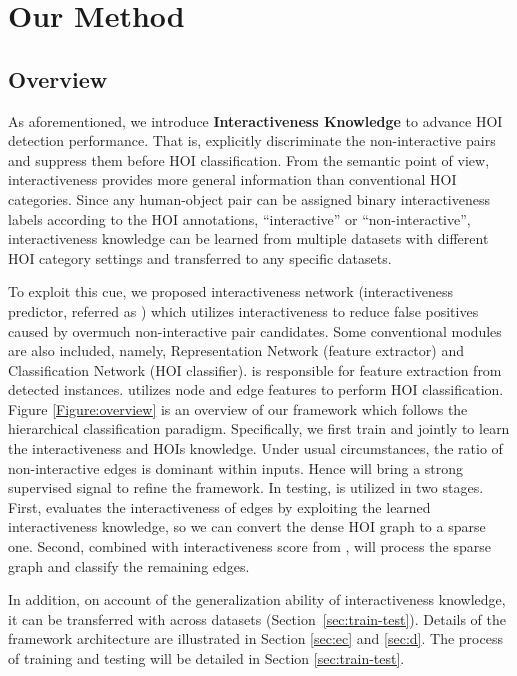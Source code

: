 \documentclass[10pt,twocolumn,letterpaper]{article}
\begin{document}
\section{Our Method}
\subsection{Overview}
As aforementioned, we introduce \textbf{Interactiveness Knowledge} to advance HOI detection performance. That is, explicitly discriminate the non-interactive pairs and suppress them before HOI classification. From the semantic point of view, interactiveness provides more general information than conventional HOI categories. Since any human-object pair can be assigned binary interactiveness labels according to the HOI annotations, \ie ``interactive'' or ``non-interactive'', interactiveness knowledge can be learned from multiple datasets with different HOI category settings and transferred to any specific datasets.

To exploit this cue, we proposed interactiveness network (interactiveness predictor, referred as ) which utilizes interactiveness to reduce false positives caused by overmuch non-interactive pair candidates. 
Some conventional modules are also included, namely, Representation Network  (feature extractor) and Classification Network  (HOI classifier). 
 is responsible for feature extraction from detected instances.  utilizes node and edge features to perform HOI classification. Figure \ref{Figure:overview} is an overview of our framework which follows the hierarchical classification paradigm. Specifically, we first train  and  jointly to learn the interactiveness and HOIs knowledge. Under usual circumstances, the ratio of non-interactive edges is dominant within inputs. Hence  will bring a strong supervised signal to refine the framework. In testing,  is utilized in two stages. First,  evaluates the interactiveness of edges by exploiting the learned interactiveness knowledge, so we can convert the dense HOI graph to a sparse one. Second, combined with interactiveness score from ,  will process the sparse graph and classify the remaining edges. 

In addition, on account of the generalization ability of interactiveness knowledge, it can be transferred with  across datasets (Section~\ref{sec:train-test}). Details of the framework architecture are illustrated in Section \ref{sec:ec} and \ref{sec:d}. The process of training and testing will be detailed in Section \ref{sec:train-test}.
\end{document}
